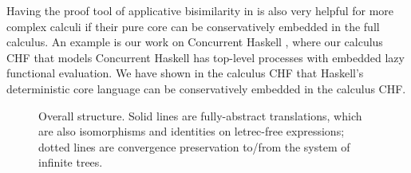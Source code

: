 \documentclass{LMCS}
\theoremstyle{plain}
\theoremstyle{definition}
\begin{document}
Having the  proof tool of applicative bisimilarity in  is also very 
helpful for more complex calculi if their pure core can be conservatively
embedded in the full calculus.
An example is our work on Concurrent Haskell 
\cite{sabel-schmidt-schauss-PPDP:2011,sabel-schmidt-schauss:12:LICS},
where our calculus CHF that models Concurrent Haskell has top-level processes
with embedded lazy functional evaluation.
We have shown in the calculus CHF that Haskell's deterministic core language
can be conservatively embedded in the calculus CHF.

\begin{figure}

\caption{Overall structure. Solid lines are fully-abstract translations, which
are also isomorphisms and identities on letrec-free expressions; dotted lines
are convergence preservation to/from the system  of infinite trees.
\label{figure:results}}
\end{figure}
\end{document}
